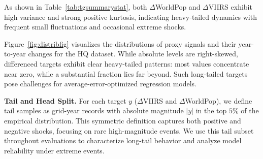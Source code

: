 \documentclass[11pt,conference,onecolumn]{IEEEtran}
\begin{document}
As shown in Table~\ref{tab:tgsummarystat}, both $\Delta$WorldPop and $\Delta$VIIRS exhibit high variance and strong positive kurtosis, indicating heavy-tailed dynamics with frequent small fluctuations and occasional extreme shocks.


\begin{table}[H]
    \centering
\end{table}
\vspace{-0.4cm}
\begin{table}[H]
    \centering
    \caption{Target summary statistics}
    \label{tab:tgsummarystat}
\end{table}

Figure~\ref{fig:distribfig} visualizes the distributions of proxy signals and their year-to-year changes for the HQ dataset. While absolute levels are right-skewed, differenced targets exhibit clear heavy-tailed patterns: most values concentrate near zero, while a substantial fraction lies far beyond. Such long-tailed targets pose challenges for average-error-optimized regression models.

\textbf{Tail and Head Split.} For each target $y$ ($\Delta$VIIRS and $\Delta$WorldPop), we define tail samples as grid-year records with absolute magnitude $|y|$ in the top $5\%$ of the empirical distribution. This symmetric definition captures both positive and negative shocks, focusing on rare high-magnitude events. We use this tail subset throughout evaluations to characterize long-tail behavior and analyze model reliability under extreme events.
\end{document}

